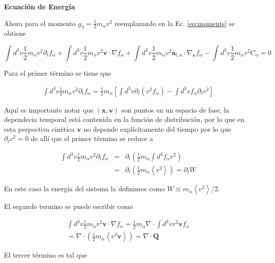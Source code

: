 \textbf{Ecuaci\'on de Energ\'ia}

Ahora para el momento $g_3 = \frac{1}{2}m_\alpha v^2$ reemplazando en la Ec. \eqref{eq:moments} se obtiene 

\begin{equation}
  \int d^3v \frac{1}{2}m_\alpha v^2 \partial_t f_\alpha + \int d^3v \frac{1}{2}m_\alpha v^2\textbf{v}\cdot\nabla f_\alpha + \int d^3v \frac{1}{2}m_\alpha v^2 \textbf{a}_{l,\alpha}\cdot\nabla_\textbf{v}f_\alpha - \int d^3v \frac{1}{2}m_\alpha v^2 C_\alpha = 0
\end{equation}

Para el primer t\'ermino se tiene que 

\begin{eqnarray*}
  \int d^3v \frac{1}{2}m_\alpha v^2\partial_tf_\alpha = \frac{1}{2}m_\alpha\left[\int d^3v \partial_t (v^2f_\alpha) - \int d^3v f_\alpha\partial_t v^2\right]
\end{eqnarray*}

Aqu\'i es importante notar que $(\textbf{x}, \textbf{v})$ son puntos en un espacio de fase, la dependecia temporal est\'a contenida en la funci\'on de distribuci\'on, por lo que en esta perpectiva cin\'etica $\textbf{v}$ no depende expl\'icitamente del tiempo por lo que $\partial_t v^2 = 0$ de all\'i que el primer t\'ermino se reduce a 

\begin{eqnarray}
  \int d^3v \frac{1}{2}m_\alpha v^2\partial_t f_\alpha &=& \partial_t \left(\frac{1}{2}m_\alpha \int d^3 f_\alpha v^2 \right) \nonumber\\
  &=& \partial_t\left(\frac{1}{2}m_\alpha \left<v^2\right>\right) = \partial_t W
  \end{eqnarray}

En este caso la energ\'ia del sistema la definimos como $W \equiv m_\alpha \left<v^2\right>/2$.

El segundo termino se puede escribir como 

\begin{eqnarray}
  \int d^3v \frac{1}{2}m_\alpha v^2\textbf{v}\cdot\nabla f_\alpha = \frac{1}{2}m_\alpha\nabla\cdot\int d^3v v^2\textbf{v}f_\alpha \nonumber \\
  = \nabla\cdot \left(\frac{1}{2}m_\alpha\left<v^2\textbf{v}\right>\right) = \nabla\cdot\textbf{Q}
\end{eqnarray}

El tercer t\'ermino es tal que 


